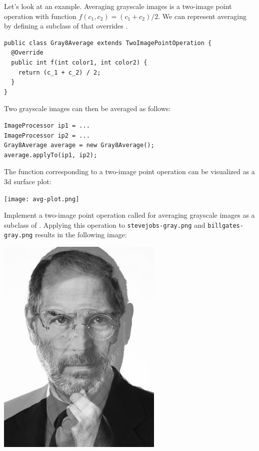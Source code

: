 \documentclass{book}
\begin{document}
Let's look at an example. Averaging grayscale images is a two-image point operation with function $f(c_1, c_2) = (c_1 + c_2) / 2$. We can represent averaging by defining a subclass of  that overrides . 
\begin{lstlisting}
public class Gray8Average extends TwoImagePointOperation {
  @Override  
  public int f(int color1, int color2) {
    return (c_1 + c_2) / 2;
  }
}
\end{lstlisting}
Two grayscale images can then be averaged as follows:
\begin{lstlisting}
ImageProcessor ip1 = ...
ImageProcessor ip2 = ...
Gray8Average average = new Gray8Average();
average.applyTo(ip1, ip2);
\end{lstlisting}
The function corresponding to a two-image point operation can be visualized as a 3d surface plot:
\begin{center}
\texttt{[image: avg-plot.png]}
\end{center}

\begin{exercise}
Implement a two-image point operation called  for averaging grayscale images as a subclass of . Applying this operation to \texttt{stevejobs-gray.png} and \texttt{billgates-gray.png} results in the following image:
\begin{center}
\includegraphics[scale=0.2]{jobs-gates-average.png}
\end{center}
\end{exercise}
\end{document}
